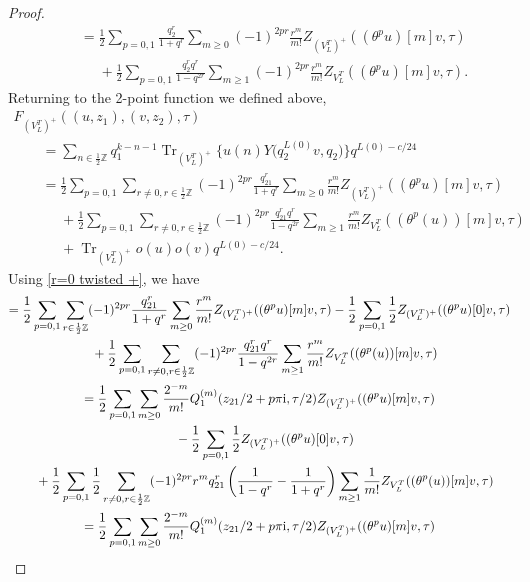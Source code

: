 \documentclass[pdftex]{sigma}
\numberwithin{equation}{section}
\theoremstyle{definition}
\begin{document}
\begin{proof}
\begin{gather*}
\qquad= \frac{1}{2} \sum_{p=0,1} \frac{q_2^r}{1 + q^r} \sum_{m \geq 0} (-1)^{2pr} \frac{r^m}{m!} Z_{(V_L^T)^+} ( (\theta^p u)[m] v, \tau ) \\
\phantom{\qquad
=}{} + \frac{1}{2} \sum_{p=0,1} \frac{q_2^r q^r}{1 - q^{2r}} \sum_{m \geq 1} (-1)^{2pr} \frac{r^m}{m!} Z_{V_L^T} ( (\theta^p u)[m] v, \tau ).
\end{gather*}
Returning to the 2-point function we defined above,
\begin{gather*}
F_{(V_L^T)^+}((u,z_1),(v,z_2),\tau)\\
\qquad= \sum_{n\in \frac{1}{2}\mathbb{Z}}q_1^{k-n-1}\operatorname{Tr}_{(V_L^T)^+}\bigl\{u(n)Y\bigl(q_2^{L(0)}v,q_2\bigr)\bigr\}q^{L(0)-c/24}\\
\qquad=\frac{1}{2}\sum_{p=0,1}\sum_{r\neq 0,r\in \frac{1}{2}\mathbb{Z}}(-1)^{2pr}\frac{q_{21}^r}{1+q^r}\sum_{m\geq 0}\frac{r^m}{m!}Z_{(V_L^T)^+}((\theta^pu)[m]v,\tau)\\
\phantom{\qquad
=}{}+\frac{1}{2}\sum_{p=0,1}\sum_{r\neq 0,r\in \frac{1}{2}\mathbb{Z}}(-1)^{2pr}\frac{q_{21}^rq^r}{1-q^{2r}}\sum_{m\geq 1}\frac{r^m}{m!}Z_{V_L^T}((\theta^p(u))[m]v, \tau)\\
\phantom{\qquad
=}{}+\operatorname{Tr}_{(V_L^T)^+}o(u)o(v)q^{L(0)-c/24}.
\end{gather*}
Using \eqref{r=0 twisted +}, we have
\begin{gather*}
=\frac{1}{2}\sum_{p=0,1}\sum_{r\in \frac{1}{2}\mathbb{Z}}(-1)^{2pr}\frac{q_{21}^r}{1+q^r}\sum_{m\geq 0}\frac{r^m}{m!}Z_{(V_L^T)^+}((\theta^pu)[m]v,\tau)-\frac{1}{2}\sum_{p=0,1}\frac{1}{2}Z_{(V_L^T)^+}((\theta^pu)[0]v,\tau)\\
\phantom{=}{}+\frac{1}{2}\sum_{p=0,1}\sum_{r\neq 0,r\in \frac{1}{2}\mathbb{Z}}(-1)^{2pr}\frac{q_{21}^rq^r}{1-q^{2r}}\sum_{m\geq 1}\frac{r^m}{m!}Z_{V_L^T}((\theta^p(u))[m]v, \tau)\\
=\frac{1}{2}\sum_{p=0,1}\sum_{m\geq 0}\frac{2^{-m}}{m!} Q_1^{(m)}(z_{21}/2+p\pi {\rm i},\tau/2) Z_{(V_L^T)^+}((\theta^pu)[m]v,\tau)\\
\phantom{=}{}-\frac{1}{2}\sum_{p=0,1}\frac{1}{2}Z_{(V_L^T)^+}((\theta^pu)[0]v,\tau)\\
\phantom{=}{}
+\frac{1}{2}\sum_{p=0,1}\frac{1}{2}\sum_{r\neq 0,r\in \frac{1}{2}\mathbb{Z}}(-1)^{2pr}r^mq_{21}^r\left(\frac{1}{1-q^r}-\frac{1}{1+q^r}\right)\sum_{m\geq 1}\frac{1}{m!}Z_{V_L^T}((\theta^p(u))[m]v, \tau)\\
=\frac{1}{2}\sum_{p=0,1}\sum_{m\geq 0}\frac{2^{-m}}{m!} Q_1^{(m)}(z_{21}/2+p\pi {\rm i},\tau/2) Z_{(V_L^T)^+}((\theta^pu)[m]v,\tau)\\

\end{gather*}
\end{proof}
\end{document}
